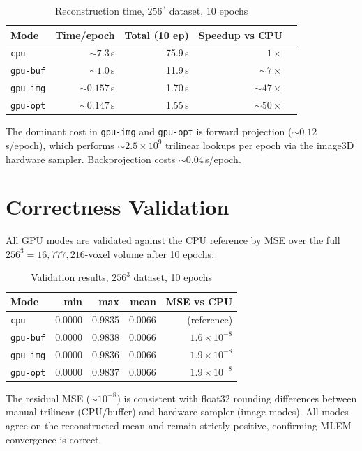 \documentclass[11pt,a4paper]{article}
\begin{document}
\begin{table}[h]
\centering
\begin{tabular}{lrrrr}
\toprule
Mode & Time/epoch & Total (10 ep) & Speedup vs CPU \\
\midrule
\texttt{cpu}     & $\sim 7.3$\,s  & 75.9\,s  & $1\times$   \\
\texttt{gpu-buf} & $\sim 1.0$\,s  & 11.9\,s  & $\sim 7\times$  \\
\texttt{gpu-img} & $\sim 0.157$\,s & 1.70\,s & $\sim 47\times$ \\
\texttt{gpu-opt} & $\sim 0.147$\,s & 1.55\,s & $\sim 50\times$ \\
\bottomrule
\end{tabular}
\caption{Reconstruction time, $256^3$ dataset, 10 epochs}
\end{table}

The dominant cost in \texttt{gpu-img} and \texttt{gpu-opt} is forward projection
($\sim 0.12$\,s/epoch), which performs $\sim 2.5\times10^9$ trilinear lookups per
epoch via the image3D hardware sampler. Backprojection costs $\sim 0.04$\,s/epoch.

\section{Correctness Validation}
\label{sec:validation}

All GPU modes are validated against the CPU reference by MSE over the full
$256^3 = 16{,}777{,}216$-voxel volume after 10 epochs:

\begin{table}[h]
\centering
\begin{tabular}{lrrrr}
\toprule
Mode & min & max & mean & MSE vs CPU \\
\midrule
\texttt{cpu}     & 0.0000 & 0.9835 & 0.0066 & (reference) \\
\texttt{gpu-buf} & 0.0000 & 0.9838 & 0.0066 & $1.6\times10^{-8}$ \\
\texttt{gpu-img} & 0.0000 & 0.9836 & 0.0066 & $1.9\times10^{-8}$ \\
\texttt{gpu-opt} & 0.0000 & 0.9837 & 0.0066 & $1.9\times10^{-8}$ \\
\bottomrule
\end{tabular}
\caption{Validation results, $256^3$ dataset, 10 epochs}
\end{table}

The residual MSE ($\sim 10^{-8}$) is consistent with float32 rounding differences
between manual trilinear (CPU/buffer) and hardware sampler (image modes). All modes
agree on the reconstructed mean and remain strictly positive, confirming MLEM
convergence is correct.
\end{document}
